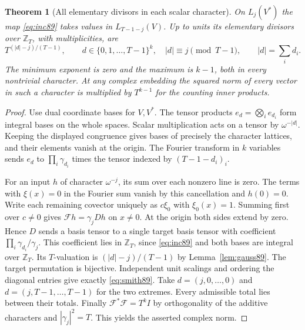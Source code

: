 \documentclass[a4paper,11pt]{article}
\newtheorem{theorem}[proposition]{Theorem}
\theoremstyle{definition}
\theoremstyle{remark}
\newcommand{\ZZ}{\mathbb Z}\newcommand{\ord}{\operatorname{ord}}
\numberwithin{equation}{section}
\begin{document}
\begin{theorem}[All elementary divisors in each scalar character]
\label{thm:smith89}
On \(L_j(V^*)\) the map \eqref{eq:inc89} takes values in
\(L_{T-1-j}(V)\). Up to units its elementary divisors over
\(\ZZ_T\), with multiplicities, are
\begin{equation}
   T^{(|d|-j)/(T-1)},\qquad
   d\in\{0,1,\ldots,T-1\}^k,\quad |d|\equiv j\pmod{T-1},
   \qquad |d|=\sum_i d_i.                                  \label{eq:smith89}
\end{equation}
The minimum exponent is zero and the maximum is \(k-1\), both
in every nontrivial character. At any complex embedding the
squared norm of every vector in such a character is multiplied
by \(T^{k-1}\) for the counting inner products.
\end{theorem}
\begin{proof}
Use dual coordinate bases for \(V,V^*\). The tensor products
\(e_d=\bigotimes_i e_{d_i}\) form integral bases on the whole
spaces. Scalar multiplication acts on a tensor by
\(\omega^{-|d|}\). Keeping the displayed congruence gives bases
of precisely the character lattices, and their elements vanish
at the origin. The Fourier transform in \(k\) variables sends
\(e_d\) to \(\prod_i\gamma_{d_i}\) times the tensor indexed by
\((T-1-d_i)_i\).

For an input \(h\) of character \(\omega^{-j}\), its sum over
each nonzero line is zero. The terms with \(\xi(x)=0\) in the
Fourier sum vanish by this cancellation and \(h(0)=0\). Write
each remaining covector uniquely as \(c\xi_0\) with
\(\xi_0(x)=1\). Summing first over \(c\ne0\) gives
\(\mathcal Fh=\gamma_j Dh\) on \(x\ne0\). At the origin both
sides extend by zero. Hence \(D\) sends a basis tensor to a
single target basis tensor with coefficient
\(\prod_i\gamma_{d_i}/\gamma_j\). This coefficient lies in
\(\ZZ_T\), since \eqref{eq:inc89} and both bases are integral
over \(\ZZ_T\). Its \(T\)-valuation is \((|d|-j)/(T-1)\)
by Lemma~\ref{lem:gauss89}. The target permutation is bijective.
Independent unit scalings and ordering the diagonal entries
give exactly \eqref{eq:smith89}. Take
\(d=(j,0,\ldots,0)\) and \(d=(j,T-1,\ldots,T-1)\) for the two
extremes. Every admissible total lies between their totals.
Finally \(\mathcal F^*\mathcal F=T^k I\) by orthogonality of
the additive characters and \(|\gamma_j|^2=T\). This yields
the asserted complex norm.
\end{proof}
\end{document}
